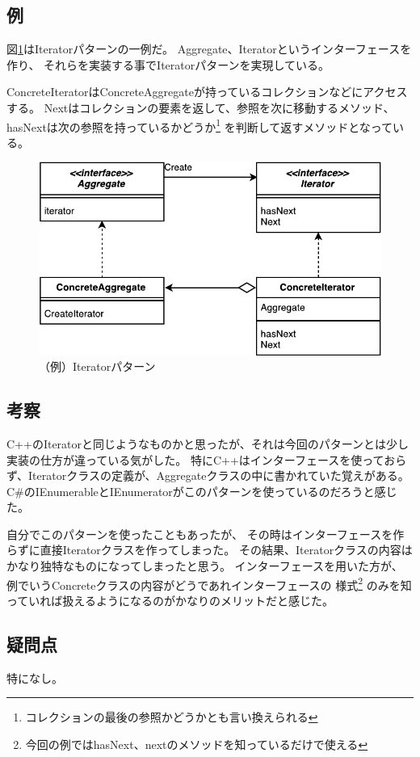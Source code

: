 \documentclass[11pt]{jsarticle}
\begin{document}
	\subsection{例}
		図\ref{fig::iterator}はIteratorパターンの一例だ。
		Aggregate、Iteratorというインターフェースを作り、
		それらを実装する事でIteratorパターンを実現している。
		
		ConcreteIteratorはConcreteAggregateが持っているコレクションなどにアクセスする。
		Nextはコレクションの要素を返して、参照を次に移動するメソッド、
		hasNextは次の参照を持っているかどうか\footnote{コレクションの最後の参照かどうかとも言い換えられる}
		を判断して返すメソッドとなっている。
	
		\begin{figure}[htbp]
			\centering
			\includegraphics[width=0.7\hsize]{IteratorPattern-crop.pdf}
			\caption{（例）Iteratorパターン}\label{fig::iterator}
		\end{figure}
		
	\subsection{考察}
		C++のIteratorと同じようなものかと思ったが、それは今回のパターンとは少し実装の仕方が違っている気がした。
		特にC++はインターフェースを使っておらず、Iteratorクラスの定義が、Aggregateクラスの中に書かれていた覚えがある。
		C\#のIEnumerableとIEnumeratorがこのパターンを使っているのだろうと感じた。
		
		自分でこのパターンを使ったこともあったが、
		その時はインターフェースを作らずに直接Iteratorクラスを作ってしまった。
		その結果、Iteratorクラスの内容はかなり独特なものになってしまったと思う。
		インターフェースを用いた方が、例でいうConcreteクラスの内容がどうであれインターフェースの
		様式\footnote{今回の例ではhasNext、nextのメソッドを知っているだけで使える}
		のみを知っていれば扱えるようになるのがかなりのメリットだと感じた。
	\subsection{疑問点}
		特になし。
\end{document}
